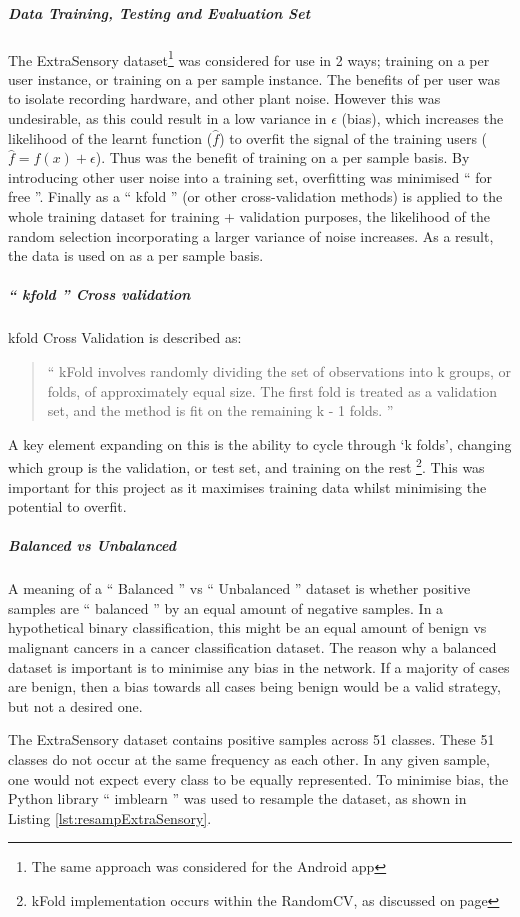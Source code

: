 \documentclass{UoNMCHA}
\newcommand{\inlineQuote}[1]{`` #1 ''}
\newcommand{\fancyquote}[1]{\begin{quotation}\inlineQuote{#1}\end{quotation}}
\newcommand{\lref}[1] {Listing \ref{#1}}
\numberwithin{equation}{section}
\begin{document}
\subparagraph{Data Training, Testing and Evaluation Set} \label{para:ExtraSensorydataset}
The ExtraSensory dataset\footnote{The same approach was considered for the Android app} was considered for use in 2 ways; training on a per user instance, or training on a per sample instance. The benefits of per user was to isolate recording hardware, and other plant noise. However this was undesirable, as this could result in a low variance in $\epsilon$ (bias), which increases the likelihood of the learnt function ($\hat{f}$) to overfit the signal of the training users ($ \hat{f} = f(x) + \epsilon$).
Thus was the benefit of training on a per sample basis. By introducing other user noise into a training set, overfitting was minimised \inlineQuote{for free}. Finally as a \inlineQuote{kfold} (or other cross-validation methods) is applied to the whole training dataset for training + validation purposes, the likelihood of the random selection incorporating a larger variance of noise increases. As a result, the data is used on as a per sample basis.

\subparagraph{\inlineQuote{kfold} Cross validation}
kfold Cross Validation is described as:
\fancyquote{kFold involves randomly dividing the set of observations into k groups, or folds, of approximately equal size. The first fold is treated as a validation set, and the method is fit on the remaining k - 1 folds. \cite{James2017}} 
A key element expanding on this is the ability to cycle through `k folds', changing which group is the validation, or test set, and training on the rest \footnote{kFold implementation occurs within the RandomCV, as discussed on page \pageref{subsec:HypOpt}}. This was important for this project as it maximises training data whilst minimising the potential to overfit. 

\subparagraph{Balanced vs Unbalanced}
A meaning of a \inlineQuote{Balanced} vs \inlineQuote{Unbalanced} dataset is whether positive samples are \inlineQuote{balanced} by an equal amount of negative samples. In a hypothetical binary classification, this might be an equal amount of benign vs malignant cancers in a cancer classification dataset. The reason why a balanced dataset is important is to minimise any bias in the network. If a majority of cases are benign, then a bias towards all cases being benign would be a valid strategy, but not a desired one. 

The ExtraSensory dataset contains positive samples across 51 classes. These 51 classes do not occur at the same frequency as each other. In any given sample, one would not expect every class to be equally represented. To minimise bias, the Python library \inlineQuote{imblearn} was used to resample the dataset, as shown in \lref{lst:resampExtraSensory}.
\end{document}
